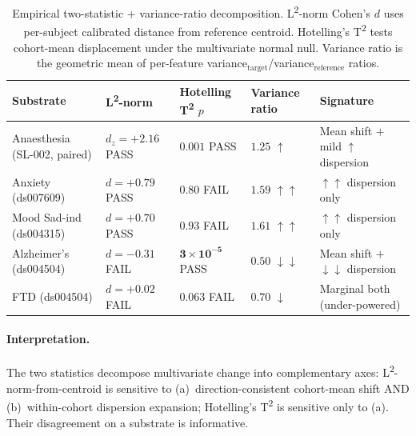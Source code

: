 \documentclass[11pt,a4paper]{article}
\begin{document}
\begin{table}[h]\centering\scriptsize
\setlength{\tabcolsep}{4pt}
\caption{Empirical two-statistic + variance-ratio decomposition. L\textsuperscript{2}-norm Cohen's $d$ uses per-subject calibrated distance from reference centroid. Hotelling's T\textsuperscript{2} tests cohort-mean displacement under the multivariate normal null. Variance ratio is the geometric mean of per-feature variance$_{\text{target}}$/variance$_{\text{reference}}$ ratios.}\label{tab:two-statistics}
\begin{tabular}{lllll}\toprule
Substrate & L\textsuperscript{2}-norm & Hotelling T\textsuperscript{2} $p$ & Variance ratio & Signature \\
\midrule
Anaesthesia (SL-002, paired) & $d_z = +2.16$ PASS & $0.001$ PASS & $1.25$ $\uparrow$ & Mean shift $+$ mild $\uparrow$ dispersion \\
Anxiety (ds007609) & $d = +0.79$ PASS & $0.80$ FAIL & $1.59$ $\uparrow\uparrow$ & $\uparrow\uparrow$ dispersion only \\
Mood Sad-ind (ds004315) & $d = +0.70$ PASS & $0.93$ FAIL & $1.61$ $\uparrow\uparrow$ & $\uparrow\uparrow$ dispersion only \\
Alzheimer's (ds004504) & $d = -0.31$ FAIL & $\mathbf{3 \times 10^{-5}}$ PASS & $0.50$ $\downarrow\downarrow$ & Mean shift $+$ $\downarrow\downarrow$ dispersion \\
FTD (ds004504) & $d = +0.02$ FAIL & $0.063$ FAIL & $0.70$ $\downarrow$ & Marginal both (under-powered) \\
\bottomrule\end{tabular}
\end{table}

\paragraph{Interpretation.} The two statistics decompose multivariate change into complementary axes: L\textsuperscript{2}-norm-from-centroid is sensitive to (a)~direction-consistent cohort-mean shift AND (b)~within-cohort dispersion expansion; Hotelling's T\textsuperscript{2} is sensitive only to (a). Their disagreement on a substrate is informative.
\end{document}

